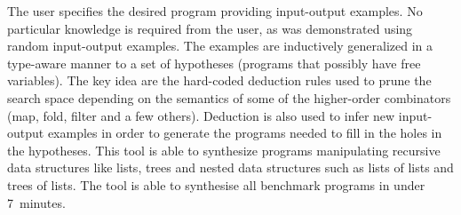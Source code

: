 \begin{enumerate}
The user specifies the desired program providing input-output examples.  
No particular knowledge is required from the user, as was demonstrated using random input-output examples.
The examples are inductively generalized in a type-aware manner to a set of hypotheses (programs that possibly have free variables).
The key idea are the hard-coded deduction rules used to prune the search space depending on the semantics of some of the higher-order combinators (map, fold, filter and a few others).
Deduction is also used to infer new input-output examples in order to generate the programs needed to fill in the holes in the hypotheses.
This tool is able to synthesize programs manipulating recursive data structures like lists, trees and nested data structures such as lists of lists and trees of lists.
The tool is able to synthesise all benchmark programs in under 7~minutes.
\end{enumerate}

